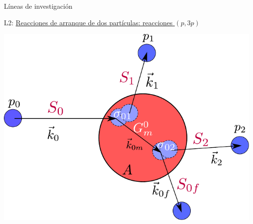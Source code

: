 \documentclass{beamer}
\begin{document}
\begin{frame}{Líneas de investigación} 

\large {}  L2: \underline{Reacciones de arranque de dos partículas: reacciones $(p, 3p)$} 

\normalsize
\begin{center}    
\includegraphics[height=0.5\textheight]{model.pdf}   
\end{center}
    
\end{frame}
\end{document}
